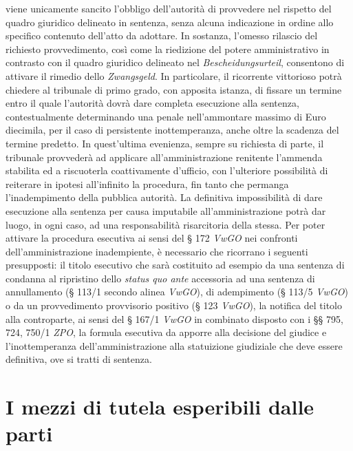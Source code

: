 \documentclass[12pt,it,a4paper,]{report}
\begin{document}
viene unicamente sancito l'obbligo dell'autorità di provvedere nel
rispetto del quadro giuridico delineato in sentenza, senza alcuna
indicazione in ordine allo specifico contenuto dell'atto da adottare. In
sostanza, l'omesso rilascio del richiesto provvedimento, così come la
riedizione del potere amministrativo in contrasto con il quadro
giuridico delineato nel \emph{Bescheidungsurteil}, consentono di
attivare il rimedio dello \emph{Zwangsgeld}. In particolare, il
ricorrente vittorioso potrà chiedere al tribunale di primo grado, con
apposita istanza, di fissare un termine entro il quale l'autorità dovrà
dare completa esecuzione alla sentenza, contestualmente determinando una
penale nell'ammontare massimo di Euro diecimila, per il caso di
persistente inottemperanza, anche oltre la scadenza del termine
predetto. In quest'ultima evenienza, sempre su richiesta di parte, il
tribunale provvederà ad applicare all'amministrazione renitente
l'ammenda stabilita ed a riscuoterla coattivamente d'ufficio, con
l'ulteriore possibilità di reiterare in ipotesi all'infinito la
procedura, fin tanto che permanga l'inadempimento della pubblica
autorità. La definitiva impossibilità di dare esecuzione alla sentenza
per causa imputabile all'amministrazione potrà dar luogo, in ogni caso,
ad una responsabilità risarcitoria della stessa. Per poter attivare la
procedura esecutiva ai sensi del § 172 \emph{VwGO} nei confronti
dell'amministrazione inadempiente, è necessario che ricorrano i seguenti
presupposti: il titolo esecutivo che sarà costituito ad esempio da una
sentenza di condanna al ripristino dello \emph{status quo ante}
accessoria ad una sentenza di annullamento (§ 113/1 secondo alinea
\emph{VwGO}), di adempimento (§ 113/5 \emph{VwGO}) o da un provvedimento
provvisorio positivo (§ 123 \emph{VwGO}), la notifica del titolo alla
controparte, ai sensi del § 167/1 \emph{VwGO} in combinato disposto con
i §§ 795, 724, 750/1 \emph{ZPO}, la formula esecutiva da apporre alla
decisione del giudice e l'inottemperanza dell'amministrazione alla
statuizione giudiziale che deve essere definitiva, ove si tratti di
sentenza.

\hypertarget{i-mezzi-di-tutela-esperibili-dalle-parti}{%
\section{I mezzi di tutela esperibili dalle
parti}\label{i-mezzi-di-tutela-esperibili-dalle-parti}}
\end{document}
